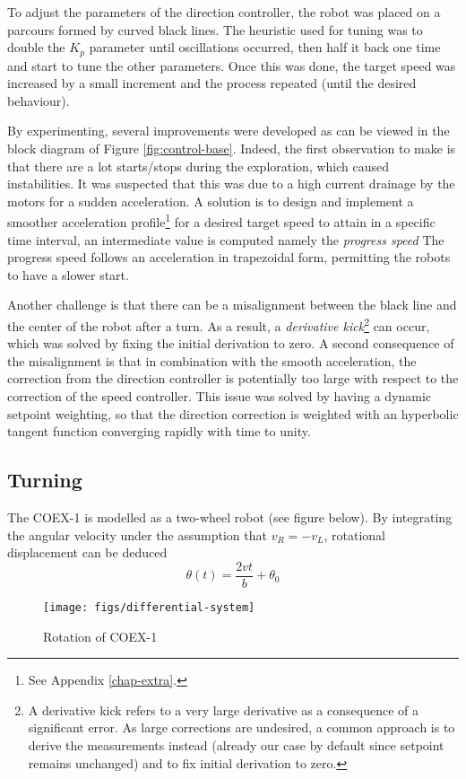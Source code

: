 \documentclass[12pt]{report}
\begin{document}
To adjust the parameters of the direction controller, the robot was placed on a parcours formed by curved black lines. The heuristic used for tuning was to double the $K_p$ parameter until oscillations occurred, then half it back one time and start to tune the other parameters. Once this was done, the target speed was increased by a small increment and the process repeated (until the desired behaviour). 

By experimenting, several improvements were developed as can be viewed in the block diagram of Figure \ref{fig:control-base}. Indeed, the first observation to make is that there are a lot starts/stops during the exploration, which caused instabilities. It was suspected that this was due to a high current drainage by the motors for a sudden acceleration. A solution is to design and implement a smoother acceleration profile\footnote{See Appendix \ref{chap-extra}.} for a desired target speed to attain in a specific time interval, an intermediate value is computed namely the \textit{progress speed} The progress speed follows an acceleration in trapezoidal form, permitting the robots to have a slower start. 



Another challenge is that there can be a misalignment between the black line and the center of the robot after a turn. As a result, a \textit{derivative kick}\footnote{A derivative kick refers to a very large derivative as a consequence of a significant error. As large corrections are undesired, a common approach is to derive the measurements instead (already our case by default since setpoint remains unchanged) and to fix initial derivation to zero.} can occur, which was solved by fixing the initial derivation to zero. A second consequence of the misalignment is that in combination with the smooth acceleration, the correction from the direction controller is potentially too large with respect to the correction of the speed controller. This issue was solved by having a dynamic setpoint weighting, so that the direction correction is weighted with an hyperbolic tangent function converging rapidly with time to unity. 

\subsection*{Turning}
The COEX-1 is modelled as a two-wheel robot (see figure below). By integrating the angular velocity under the assumption that $v_R = -v_L$, rotational displacement can be deduced
\begin{equation}\label{eq:theta-turn}
\theta(t) = \frac{2vt}{b} + \theta_0
\end{equation}
\begin{figure}[hbtp]
\centering
\texttt{[image: figs/differential-system]}
\caption{Rotation of COEX-1}
\label{fig:model-turn}
\end{figure}
\end{document}
